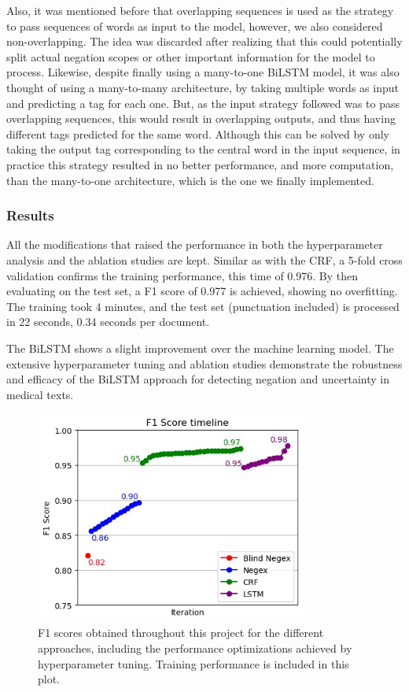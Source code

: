 \documentclass{article}
\begin{document}
Also, it was mentioned before that overlapping sequences is used as the strategy to pass sequences of words as input to
the model, however, we also considered non-overlapping. The idea was discarded after realizing that this could potentially
split actual negation scopes or other important information for the model to process. Likewise, despite finally using a
many-to-one BiLSTM model, it was also thought of using a many-to-many architecture, by taking multiple words as input and
predicting a tag for each one. But, as the input strategy followed was to pass overlapping sequences, this would result
in overlapping outputs, and thus having different tags predicted for the same word. Although this can be solved by only
taking the output tag corresponding to the central word in the input sequence, in practice this strategy resulted in no
better performance, and more computation, than the many-to-one architecture, which is the one we finally implemented.

\subsubsection*{Results}
All the modifications that raised the performance in both the hyperparameter analysis and the ablation studies are kept.
Similar as with the CRF, a 5-fold cross validation confirms the training performance, this time of 0.976. By then evaluating
on the test set, a F1 score of 0.977 is achieved, showing no overfitting. The training took 4 minutes, and the test set
(punctuation included) is processed in 22 seconds, 0.34 seconds per document.

The BiLSTM shows a slight improvement over the machine learning model. The extensive hyperparameter tuning and ablation
studies demonstrate the robustness and efficacy of the BiLSTM approach for detecting negation and uncertainty in medical texts.

\begin{figure}[!t]
	\centering
	\includegraphics[height=7cm]{images/score_timeline.jpg}
	\captionsetup{width=0.9\textwidth}
	\caption{F1 scores obtained throughout this project for the different approaches, including the
	performance optimizations achieved by hyperparameter tuning. Training performance is included in
	this plot.}
	\label{fig:score_timeline}
\end{figure}
\end{document}
